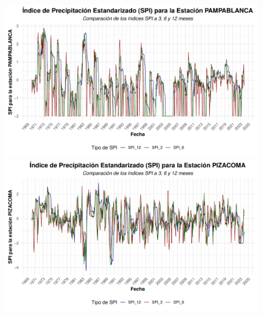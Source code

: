 \begin{landscape}
\begin{figure}[h!]
\begin{minipage}{0.45\textwidth}
\end{minipage}

\end{figure}
\end{landscape}

\begin{landscape}  %

\begin{figure}[h!]
\centering
\begin{minipage}{0.45\textwidth}
    \centering
    \includegraphics[width=\linewidth]{Capitulos/spi/SPI_Station_PAMPABLANCA.pdf}
  
\end{minipage} \hfill
\begin{minipage}{0.45\textwidth}
    \centering
    \includegraphics[width=\linewidth]{Capitulos/spi/SPI_Station_PIZACOMA.pdf}
    

\end{minipage}
\end{figure}
\end{landscape}
